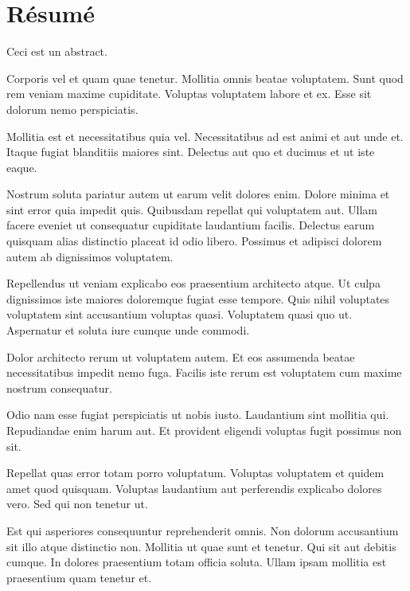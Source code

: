 \chapter[Résumé (français)]{Résumé}


Ceci est un abstract.

Corporis vel et quam quae tenetur. Mollitia omnis beatae voluptatem. Sunt quod rem veniam maxime cupiditate. Voluptas voluptatem labore et ex. Esse sit dolorum nemo perspiciatis.

Mollitia est et necessitatibus quia vel. Necessitatibus ad est animi et aut unde et. Itaque fugiat blanditiis maiores sint. Delectus aut quo et ducimus et ut iste eaque.

Nostrum soluta pariatur autem ut earum velit dolores enim. Dolore minima et sint error quia impedit quis. Quibusdam repellat qui voluptatem aut. Ullam facere eveniet ut consequatur cupiditate laudantium facilis. Delectus earum quisquam alias distinctio placeat id odio libero. Possimus et adipisci dolorem autem ab dignissimos voluptatem.

Repellendus ut veniam explicabo eos praesentium architecto atque. Ut culpa dignissimos iste maiores doloremque fugiat esse tempore. Quis nihil voluptates voluptatem sint accusantium voluptas quasi. Voluptatem quasi quo ut. Aspernatur et soluta iure cumque unde commodi.

Dolor architecto rerum ut voluptatem autem. Et eos assumenda beatae necessitatibus impedit nemo fuga. Facilis iste rerum est voluptatem cum maxime nostrum consequatur.

Odio nam esse fugiat perspiciatis ut nobis iusto. Laudantium sint mollitia qui. Repudiandae enim harum aut. Et provident eligendi voluptas fugit possimus non sit.

Repellat quas error totam porro voluptatum. Voluptas voluptatem et quidem amet quod quisquam. Voluptas laudantium aut perferendis explicabo dolores vero. Sed qui non tenetur ut.

Est qui asperiores consequuntur reprehenderit omnis. Non dolorum accusantium sit illo atque distinctio non. Mollitia ut quae sunt et tenetur. Qui sit aut debitis cumque. In dolores praesentium totam officia soluta. Ullam ipsam mollitia est praesentium quam tenetur et.
